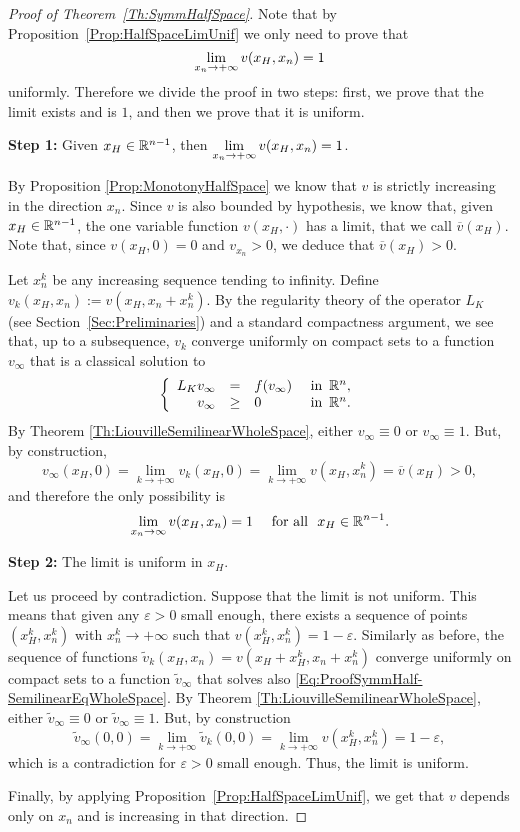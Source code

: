 \begin{proof}[Proof of Theorem~\ref{Th:SymmHalfSpace}]
Note that by Proposition~\ref{Prop:HalfSpaceLimUnif} we only need to prove that
$$
\displaystyle \lim_{x_n\to+ \infty} v(x_H,x_n) = 1
$$
uniformly. Therefore we divide the proof in two steps: first, we prove that the limit exists and is $1$, and then we prove that it is uniform.


\textbf{Step 1:} Given $x_H\in \mathbb{R}^{n-1}$, then  $\displaystyle \lim_{x_n\to +\infty} v(x_H,x_n) = 1$.

By Proposition \ref{Prop:MonotonyHalfSpace} we know that $v$ is strictly increasing in the direction $x_n$. Since $v$ is also bounded by hypothesis, we know that, given $x_H\in\mathbb{R}^{n-1}$, the one variable function $v(x_H,\cdot)$ has a limit, that we call $\overline{v}(x_H)$. Note that, since $v(x_H,0) = 0$ and $v_{x_n}>0$, we deduce that $\overline{v}(x_H) > 0$.

Let $x_n^k$ be any increasing sequence tending to infinity. Define $v_k(x_H,x_n) := v(x_H,x_n+x_n^k)$. By the regularity theory of the operator $L_K $ (see Section~\ref{Sec:Preliminaries}) and a standard compactness argument, we see that, up to a subsequence, $v_k$ converge uniformly on compact sets to a function $v_\infty$ that is a classical solution to
\begin{equation}
\label{Eq:ProofSymmHalf-SemilinearEqWholeSpace}
\left\{\begin{array}{rcll}
L_K v_\infty &=& f(v_\infty)   &\textrm{ in } \,\mathbb{R}^n,\\
v_\infty &\geq& 0   &\textrm{ in } \,\mathbb{R}^n.
\end{array} \right.
\end{equation}
By Theorem \ref{Th:LiouvilleSemilinearWholeSpace}, either $v_\infty\equiv 0$ or $v_\infty \equiv 1$. But, by construction,
$$ v_\infty(x_H,0) = \lim_{k\to + \infty} v_k(x_H,0) = \lim_{k\to + \infty} v(x_H,x_n^k) = \overline{v}(x_H) > 0, $$
and therefore the only possibility is
$$ \lim_{x_n\to \infty} v(x_H,x_n) = 1 \quad \text{ for all } \ x_H\in\mathbb{R}^{n-1}. $$

\textbf{Step 2:} The limit is uniform in $x_H$.

Let us proceed by contradiction. Suppose that the limit is not uniform. This means that given any $\varepsilon>0$ small enough, there exists a sequence of points $(x_H^k,x_n^k)$ with $x_n^k\to +\infty$ such that $v(x_H^k,x_n^k) = 1-\varepsilon$. Similarly as before, the sequence of functions $\tilde{v}_k(x_H,x_n) = v(x_H+x_H^k,x_n+x_n^k)$ converge uniformly on compact sets to a function $\tilde{v}_\infty$ that solves also \eqref{Eq:ProofSymmHalf-SemilinearEqWholeSpace}. By Theorem \ref{Th:LiouvilleSemilinearWholeSpace}, either $\tilde{v}_\infty\equiv 0$ or $\tilde{v}_\infty \equiv 1$. But, by construction
$$ 
\tilde{v}_\infty(0,0) = \lim_{k\to +\infty} \tilde{v}_k(0,0) = \lim_{k\to +\infty} v(x_H^k,x_n^k) = 1-\varepsilon, 
$$
which is a contradiction for $\varepsilon>0$ small enough. Thus, the limit is uniform.

Finally, by applying Proposition~\ref{Prop:HalfSpaceLimUnif}, we get that $v$ depends only on $x_n$ and is increasing in that direction.
\end{proof}
